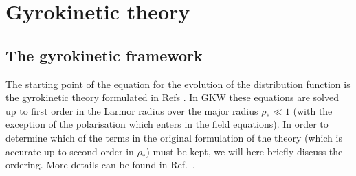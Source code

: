 \chapter{Gyrokinetic theory}

\section{The gyrokinetic framework}
\label{sec:framework}
The starting point of the equation for the evolution of the distribution function is the 
gyrokinetic theory formulated in Refs \cite{LIT83,HAH88,BRI88,SUG00}. In GKW these equations 
are solved up to first order in the Larmor radius over the major radius $\rho_* \ll 1 $ 
(with the exception of the polarisation which enters in the field equations). 
In order to determine which of the terms in the original formulation of the theory (which is
accurate up to second order in $\rho_*$) must be kept, we will here briefly discuss the ordering. 
More details can be found in Ref.~\cite{PEE09}.

